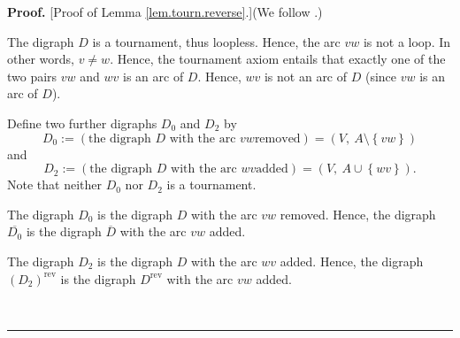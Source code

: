 \documentclass[numbers=enddot,12pt,final,onecolumn,notitlepage]{scrartcl}%
\numberwithin{exer}{subsection}
\theoremstyle{definition}
\newenvironment{proof}[1][Proof]{\noindent\textbf{#1.} }{\ \rule{0.5em}{0.5em}}
\begin{document}
\begin{proof}
[Proof of Lemma \ref{lem.tourn.reverse}.](We follow \cite[\S 10.2,\ Theorem
6]{Berge91}.)

The digraph $D$ is a tournament, thus loopless. Hence, the arc $vw$ is not a
loop. In other words, $v\neq w$. Hence, the tournament axiom entails that
exactly one of the two pairs $vw$ and $wv$ is an arc of $D$. Hence, $wv$ is
not an arc of $D$ (since $vw$ is an arc of $D$).

Define two further digraphs $D_{0}$ and $D_{2}$ by%
\[
D_{0}:=\left(  \text{the digraph }D\text{ with the arc }vw\text{
removed}\right)  =\left(  V,\ A\setminus\left\{  vw\right\}  \right)
\]
and%
\[
D_{2}:=\left(  \text{the digraph }D\text{ with the arc }wv\text{
added}\right)  =\left(  V,\ A\cup\left\{  wv\right\}  \right)  .
\]
Note that neither $D_{0}$ nor $D_{2}$ is a tournament.

The digraph $D_{0}$ is the digraph $D$ with the arc $vw$ removed. Hence, the
digraph $\overline{D_{0}}$ is the digraph $\overline{D}$ with the arc $vw$ added.

The digraph $D_{2}$ is the digraph $D$ with the arc $wv$ added. Hence, the
digraph $\left(  D_{2}\right)  ^{\operatorname*{rev}}$ is the digraph
$D^{\operatorname*{rev}}$ with the arc $vw$ added.


\end{proof}
\end{document}
